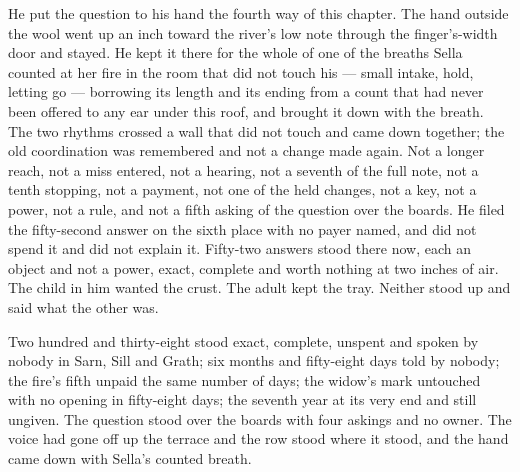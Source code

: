 He put the question to his hand the fourth way of this chapter. The hand outside the wool went up an inch toward the river's low note through the finger's-width door and stayed. He kept it there for the whole of one of the breaths Sella counted at her fire in the room that did not touch his --- small intake, hold, letting go --- borrowing its length and its ending from a count that had never been offered to any ear under this roof, and brought it down with the breath. The two rhythms crossed a wall that did not touch and came down together; the old coordination was remembered and not a change made again. Not a longer reach, not a miss entered, not a hearing, not a seventh of the full note, not a tenth stopping, not a payment, not one of the held changes, not a key, not a power, not a rule, and not a fifth asking of the question over the boards. He filed the fifty-second answer on the sixth place with no payer named, and did not spend it and did not explain it. Fifty-two answers stood there now, each an object and not a power, exact, complete and worth nothing at two inches of air. The child in him wanted the crust. The adult kept the tray. Neither stood up and said what the other was.

Two hundred and thirty-eight stood exact, complete, unspent and spoken by nobody in Sarn, Sill and Grath; six months and fifty-eight days told by nobody; the fire's fifth unpaid the same number of days; the widow's mark untouched with no opening in fifty-eight days; the seventh year at its very end and still ungiven. The question stood over the boards with four askings and no owner. The voice had gone off up the terrace and the row stood where it stood, and the hand came down with Sella's counted breath.
